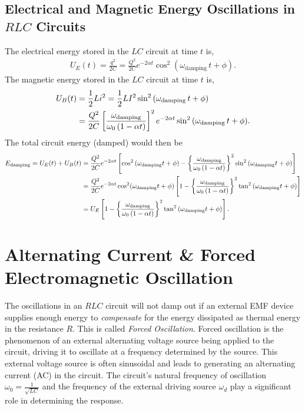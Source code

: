 \documentclass[12pt,b4paper]{article}
\begin{document}
\subsection{Electrical and Magnetic Energy Oscillations in $RLC$ Circuits}
The electrical energy stored in the $LC$ circuit at time $t$ is,
\begin{align}
    U_E(t)=\frac{q^2}{2C}=\frac{Q^2}{2C}e^{-2\alpha t}\cos^2{(\omega_\text{damping}\,t+\phi)}.
\end{align}
The magnetic energy stored in the $LC$ circuit at time $t$ is,
\begin{align}
    U_B(t)&=\frac{1}{2}Li^2=\frac{1}{2}LI^2\sin^2{(\omega_\text{damping}\,t+\phi)}\notag\\
    &=\frac{Q^2}{2C}\left[\frac{\omega_\text{damping}}{\omega_0\left(1-\alpha t\right)}\right]^2e^{-2\alpha t}\sin^2{(\omega_\text{damping}\,t+\phi)}.
\end{align}
The total circuit energy (damped) would then be
\begin{align}
    E_\text{damping}=U_E(t)+U_B(t)&=\frac{Q^2}{2C}e^{-2\alpha t}\left[\cos^2{(\omega_\text{damping} t+\phi)-\left\{\frac{\omega_\text{damping}}{\omega_0\left(1-\alpha t\right)}\right\}^2\sin^2{(\omega_\text{damping} t+\phi)}}\right]\notag\\
    &=\frac{Q^2}{2C}e^{-2\alpha t}\cos^2(\omega_\text{damping} t+\phi)\left[1-\left\{\frac{\omega_\text{damping}}{\omega_0\left(1-\alpha t\right)}\right\}^2\tan^2{(\omega_\text{damping} t+\phi)}\right]\notag\\
    &=U_E\left[1-\left\{\frac{\omega_\text{damping}}{\omega_0\left(1-\alpha t\right)}\right\}^2\tan^2{(\omega_\text{damping} t+\phi)}\right].
\end{align}

\section{Alternating Current \& Forced Electromagnetic Oscillation}
The oscillations in an $RLC$ circuit will not damp out if an external EMF device supplies enough energy to \textit{compensate} for the energy dissipated as thermal energy in the resistance $R$. This is called \textit{Forced Oscillation}. Forced oscillation is the phenomenon of an external alternating voltage source being applied to the circuit, driving it to oscillate at a frequency determined by the source. This external voltage source is often sinusoidal and leads to generating an alternating current (AC) in the circuit. The circuit's natural frequency of oscillation $\displaystyle\omega_0=\frac{1}{\sqrt{LC}}$ and the frequency of the external driving source $\omega_d$ play a significant role in determining the response.
\end{document}
